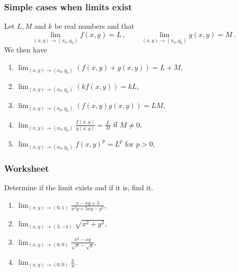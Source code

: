 \documentclass[aspectratio=169,handout]{beamer}
\begin{document}
\begin{frame}
    \frametitle{Simple cases when limits exist}
    \begin{theorem}
Let $L,M$ and $k$ be real numbers and that 
\begin{equation*}
    \lim_{(x,y) \to (x_0,y_0)} f(x,y) = L \,, \qquad 
    \lim_{(x,y) \to (x_0,y_0)} g(x,y) = M \,.
\end{equation*}
We then have

\begin{multicols}{2}
\begin{enumerate}
    \item $\displaystyle \lim_{(x,y) \to (x_0,y_0)} (f(x,y) + g(x,y)) = L + M$,

    \item $\displaystyle  \lim_{(x,y) \to (x_0,y_0)} (k f(x,y)) = kL$,

    \item $\displaystyle \lim_{(x,y) \to (x_0,y_0)} (f(x,y) g(x,y)) = LM$,

    \item $\displaystyle \lim_{(x,y) \to (x_0,y_0)} \frac{f(x,y)}{g(x,y)} = \frac{L}{M}$ if $M \not= 0$,

    \item $\displaystyle \lim_{(x,y) \to (x_0,y_0)} {f(x,y)^p} = L^p$ for $p>0$,
\end{enumerate}
\end{multicols}
   \end{theorem}
\end{frame}


\begin{frame}
    \frametitle{Worksheet}
    Determine if the limit exists and if it is, find it.
    \begin{enumerate}
        \item $\displaystyle \lim_{(x,y) \to (0,1)} \frac{x - xy + 3}{x^2y + 5xy - y^3}$,
        \item $\displaystyle \lim_{(x,y) \to (3,-4)} \sqrt{x^2 + y^2}$,
        \item $\displaystyle \lim_{(x,y) \to (0,0)} \frac{x^2 - xy}{\sqrt{x} - \sqrt{y}}$,
        \item $ \displaystyle \lim_{(x,y) \to (0,0)} \frac{x}{y} $.
    \end{enumerate}
\end{frame}
\end{document}
